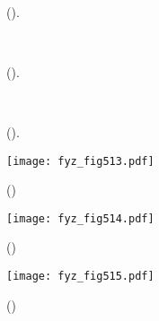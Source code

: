   \begin{figure}[hb!] %
    \centering
     \\
    \caption{
             (\cite[s.~601]{Feynman01}).}
    \label{fyz:fig510}
  \end{figure}

  \begin{figure}[hb!] %
    \centering
     \\
    \caption{
             (\cite[s.~601]{Feynman01}).}
    \label{fyz:fig511}
  \end{figure}

  \begin{figure}[hb!] %
    \centering
     \\
    \caption{
             (\cite[s.~601]{Feynman01}).}
    \label{fyz:fig512}
  \end{figure}

  \begin{figure}[ht!] %
    \centering
    \texttt{[image: fyz\_fig513.pdf]}
    \caption{
             (\cite[s.~697]{Feynman01})}
    \label{fyz:fig513}
  \end{figure}

  \begin{figure}[ht!] %
    \centering
    \texttt{[image: fyz\_fig514.pdf]}
    \caption{
             (\cite[s.~697]{Feynman01})}
    \label{fyz:fig514}
  \end{figure}

  \begin{figure}[ht!] %
    \centering
    \texttt{[image: fyz\_fig515.pdf]}
    \caption{
             (\cite[s.~697]{Feynman01})}
    \label{fyz:fig515}
  \end{figure}
 
